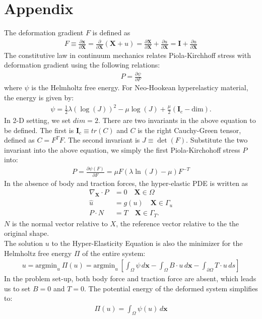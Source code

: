 \section{Appendix}
\label{appdx:hyperelasticity_pde}
The deformation gradient $F$ is defined as 
\begin{align*}
    F \equiv \frac{\partial \bm{x}}{\partial \mathbf{X}} = \frac{\partial}{\partial \mathbf{X}} \left(\mathbf{X} + u\right) = \frac{\partial \mathbf{X}}{\partial \mathbf{X}} + \frac{\partial u}{\partial \mathbf{X}} = \mathbf{I} + \frac{\partial u}{\partial \mathbf{X}}
\end{align*}
The constitutive law in continuum mechanics relates Piola-Kirchhoff stress with deformation gradient using the following relations:
\begin{align*}
    P = \frac{\partial \psi}{\partial F}
\end{align*}
where $\psi$ is the Helmholtz free energy. For Neo-Hookean hyperelasticy material, the energy is given by:
\begin{align*}
    \psi = \frac{1}{2}\lambda \left(\log(J)\right)^2 - \mu \log(J) + \frac{\mu}{2} (\mathbf{I}_c - \text{dim}).
\end{align*}
In 2-D setting, we set $dim=2$. There are two invariants in the above equation to be defined. The first is $\mathbf{I}_c \equiv tr(C) $ and $C$ is the right Cauchy-Green tensor, defined as $C = F^T F$. The second invariant is  $J \equiv \det (F)$. Substitute the two invariant into the above equation, we simply the first Piola-Kirchohoff stress $P$ into: 
\begin{align*}
    P = \frac{\partial \psi(F)}{\partial F} = \mu F \left(\lambda \ln (J) - \mu\right) F^{-T}
\end{align*}
In the absence of body and traction forces, the hyper-elastic PDE is written as
\begin{align*}
    \nabla_{\mathbf{X}} \cdot P &= 0 \quad \mathbf{X} \in \Omega \\
    \hat{u} &= g(u) \quad \mathbf{X} \in \Gamma_u \\
    P \cdot N &= T \quad \mathbf{X} \in \Gamma_T. 
\end{align*}
$N$ is the normal vector relative to $X$, the reference vector relative to the the original shape. \\
The solution $u$ to the Hyper-Elasticity Equation is also the minimizer for the Helmholtz free energy $\Pi$ of the entire system:
 \begin{align*}
    u = \text{argmin}_u\ 
    \Pi(u) = \text{argmin}_u\  \left[\int_{\Omega} \psi \, d\bm{x} -\int_{\Omega} B \cdot u \, d\bm{x} -\int_{\partial \Omega} T \cdot u \, ds\right]
\end{align*}
In the problem set-up, both body force and traction force are absent, which leads us to set $B = 0 $ and $T = 0$. The potential energy of the deformed system simplifies to: 
\begin{align*}
    \Pi(u) = \int_{\Omega} \psi(u) \, d\bm{x}
\end{align*}

